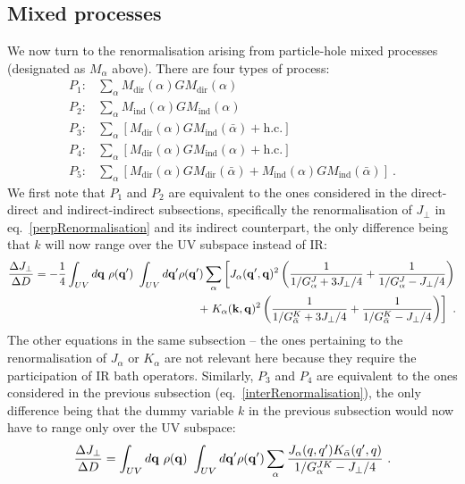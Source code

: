 \subsection{Mixed processes}
We now turn to the renormalisation arising from particle-hole mixed processes (designated as \(M_\alpha\) above). There are four types of process:
\begin{equation}\begin{aligned}
	P_1:& \sum_\alpha M_\text{dir}(\alpha) G M_\text{dir}(\alpha)\\
	P_2:& \sum_\alpha M_\text{ind}(\alpha) G M_\text{ind}(\alpha)\\
	P_3:& \sum_\alpha \left[M_\text{dir}(\alpha) G M_\text{ind}(\bar\alpha) + \text{h.c.}\right]\\
	P_4:& \sum_\alpha \left[M_\text{dir}(\alpha) G M_\text{ind}(\alpha) + \text{h.c.}\right]\\
	P_5:& \sum_\alpha \left[M_\text{dir}(\alpha) G M_\text{dir}(\bar\alpha) + M_\text{ind}(\alpha) G M_\text{ind}(\bar\alpha)\right]~.
\end{aligned}\end{equation}
We first note that \(P_1\) and \(P_2\) are equivalent to the ones considered in the direct-direct and indirect-indirect subsections, specifically the renormalisation of \(J_\perp\) in eq.~\ref{perpRenormalisation} and its indirect counterpart, the only difference being that \(k\) will now range over the UV subspace instead of IR:
\begin{equation}\begin{aligned}
	\frac{\Delta J_\perp}{\Delta D} = -\frac{1}{4}\int_{UV} d{\bf q} ~\rho({\bf q}^\prime)~\int_{UV} d{\bf q}^\prime \rho({\bf q}^\prime) \sum_\alpha \left[J_\alpha({\bf q}^\prime, {\bf q})^2\left(\frac{1}{1/G_\alpha^{J} + 3J_\perp/4} + \frac{1}{1/G_\alpha^{J} - J_\perp/4}\right) \right.\\
	+ \left.K_\alpha({\bf k}, {\bf q})^2\left(\frac{1}{1/ G_{\bar\alpha}^K + 3J_\perp/4} + \frac{1}{1/ G_{\bar\alpha}^K - J_\perp/4}\right)\right]~.
\end{aligned}\end{equation}
The other equations in the same subsection -- the ones pertaining to the renormalisation of \(J_\alpha\) or \(K_\alpha\) are not relevant here because they require the participation of IR bath operators. Similarly, \(P_3\) and \(P_4\) are equivalent to the ones considered in the previous subsection (eq.~\ref{interRenormalisation}), the only difference being that the dummy variable \(k\) in the previous subsection would now have to range only over the UV subspace:
\begin{equation}\begin{aligned}
	\frac{\Delta J_\perp}{\Delta D} = \int_{UV} d{\bf q} ~\rho({\bf q})~\int_{UV} d{\bf q}^\prime \rho({\bf q}^\prime) \sum_{\alpha} \frac{J_\alpha(q, q^\prime)K_{\bar\alpha}(q^\prime, q)}{1/G^{JK}_\alpha - J_\perp / 4}~.
\end{aligned}\end{equation}

